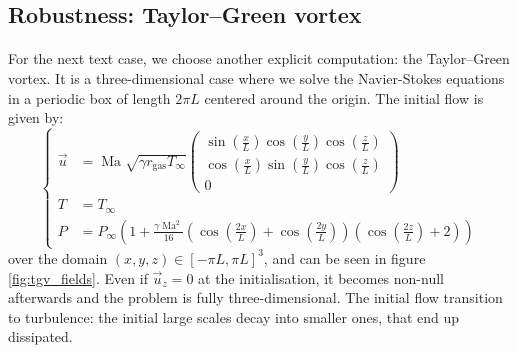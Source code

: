     \subsection{Robustness: Taylor--Green vortex}

      \paragraph{}
      For the next text case, we choose another explicit computation: the Taylor--Green vortex.
      It is a three-dimensional case where we solve the Navier-Stokes equations in a periodic box of length $2 \pi L$ centered around the origin.
      The initial flow is given by:
      \begin{equation}\label{eq:tgv}
        \left\{\begin{aligned}
          \vec{u} &= \operatorname{Ma} \sqrt{\gamma r_\textrm{gas} T_\infty} \begin{pmatrix}
            \sin\left(\frac{x}{L}\right) \cos\left(\frac{y}{L}\right) \cos\left(\frac{z}{L}\right) \\[10pt]
            \cos\left(\frac{x}{L}\right) \sin\left(\frac{y}{L}\right) \cos\left(\frac{z}{L}\right) \\[10pt]
            0
          \end{pmatrix} \\[10pt]
          T &= T_\infty \\[10pt]
          P &= P_\infty \left(1 + \frac{\gamma \operatorname{Ma}^2}{16} \left(\cos\left(\frac{2x}{L}\right) + \cos\left(\frac{2y}{L}\right)\right) \left(\cos\left(\frac{2z}{L}\right) + 2\right) \right)
        \end{aligned}\right.
      \end{equation}
      over the domain $\left(x, y, z\right) \in \left[-\pi L, \pi L\right]^3$, and can be seen in figure \ref{fig:tgv_fields}.
      Even if $\vec{u}_z = 0$ at the initialisation, it becomes non-null afterwards and the problem is fully three-dimensional.
      The initial flow transition to turbulence: the initial large scales decay into smaller ones, that end up dissipated.

